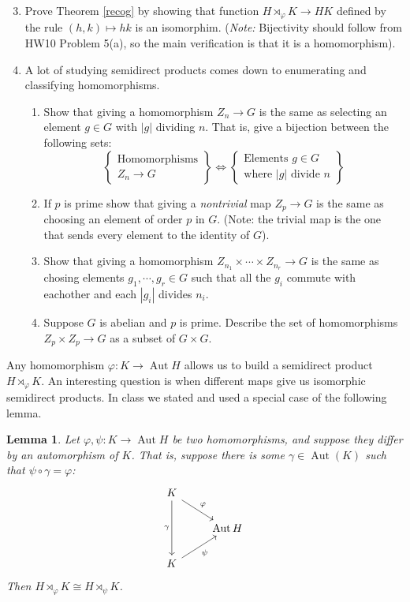 \documentclass[11pt]{article}
\newtheorem{lemma}[theorem]{Lemma}
\newcommand{\Aut}{\operatorname{Aut}}
\begin{document}
\begin{enumerate}
\setcounter{enumi}{2}
\item Prove Theorem \ref{recog} by showing that function $H\rtimes_{\varphi} K\to HK$ defined by the rule $(h,k)\mapsto hk$ is an isomorphim.  (\textit{Note:} Bijectivity should follow from HW10 Problem 5(a), so the main verification is that it is a homomorphism).
 \item A lot of studying semidirect products comes down to enumerating and classifying homomorphisms.
 \begin{enumerate}
    \item{
    Show that giving a homomorphism $Z_n\to G$ is the same as selecting an element $g\in G$ with $|g|$ dividing $n$.  That is, give a bijection between the following sets:
    \[\left\{
    \begin{array}{c}
      \text{Homomorphisms}\\
      Z_n\to G
    \end{array}\right\}
    \Longleftrightarrow
    \left\{
    \begin{array}{c}
      \text{Elements }g\in G\\
      \text{where }|g|\text{ divide }n
    \end{array}
    \right\}
    \]
    }
    \item{
    If $p$ is prime show that giving a \textit{nontrivial} map $Z_p\to G$ is the same as choosing an element of order $p$ in $G$. (Note: the trivial map is the one that sends every element to the identity of $G$).
    }
    \item{
    Show that giving a homomorphism $Z_{n_1}\times\cdots\times Z_{n_r}\to G$ is the same as chosing elements $g_1,\cdots,g_r\in G$ such that all the $g_i$ commute with eachother and each $|g_i|$ divides $n_i$.
    }
    \item{
    Suppose $G$ is abelian and $p$ is prime.  Describe the set of homomorphisms $Z_p\times Z_p\to G$ as a subset of $G\times G$.
    }
  \end{enumerate}

\end{enumerate}
Any homomorphism $\varphi:K\to\Aut H$ allows us to build a semidirect product $H\rtimes_\varphi K$.  An interesting question is when different maps give us isomorphic semidirect products.  In class we stated and used a special case of the following lemma.
\begin{lemma}\label{leftSemidirect}
  Let $\varphi,\psi:K\to\Aut H$ be two homomorphisms, and suppose they differ by an automorphism of $K$.  That is, suppose there is some $\gamma\in\Aut(K)$ such that $\psi\circ\gamma = \varphi$:
  \[
  \begin{tikzcd}
    K\ar[dr,"\varphi"]\ar[dd,swap,"\gamma"] & \\
     & \Aut H\\
    K\ar[ur,swap, "\psi"] &
  \end{tikzcd}
  \]
  Then $H\rtimes_\varphi K\cong H\rtimes_\psi K$.
\end{lemma}
\end{document}
